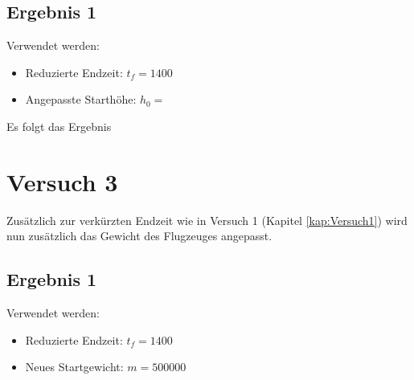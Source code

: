 \subsection{Ergebnis 1}
Verwendet werden:
\begin{itemize}
\item Reduzierte Endzeit: $t_f = 1400$
\item Angepasste Starthöhe: $h_0 = $
\end{itemize}
Es folgt das Ergebnis
 


















\newpage
\section{Versuch 3}
Zusätzlich zur verkürzten Endzeit wie in Versuch 1 (Kapitel \ref{kap:Versuch1}) wird nun zusätzlich das Gewicht des Flugzeuges angepasst.

\subsection{Ergebnis 1}
Verwendet werden:
\begin{itemize}
\item Reduzierte Endzeit: $t_f = 1400$
\item Neues Startgewicht: $m = 500000$
\end{itemize}










